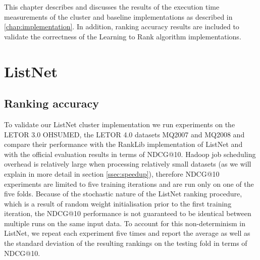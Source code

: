 This chapter describes and discusses the results of the execution time measurements of the cluster and baseline implementations as described in \ref{chap:implementation}. In addition, ranking accuracy results are included to validate the correctness of the Learning to Rank algorithm implementations.
\section{ListNet}

\subsection{Ranking accuracy}
To validate our ListNet cluster implementation we run experiments on the LETOR 3.0 OHSUMED, the LETOR 4.0 datasets MQ2007 and MQ2008 and compare their performance with the RankLib implementation of ListNet and with the official evaluation results in terms of \ac{NDCG}@10. Hadoop job scheduling overhead is relatively large when processing relatively small datasets (as we will explain in more detail in section \ref{ssec:speedup}), therefore \ac{NDCG}@10 experiments are limited to five training iterations and are run only on one of the five folds. Because of the stochastic nature of the ListNet ranking procedure, which is a result of random weight initialisation prior to the first training iteration, the \ac{NDCG}@10 performance is not guaranteed to be identical between multiple runs on the same input data. To account for this non-determinism in ListNet, we repeat each experiment five times and report the average as well as the standard deviation of the resulting rankings on the testing fold in terms of \ac{NDCG}@10.\\

